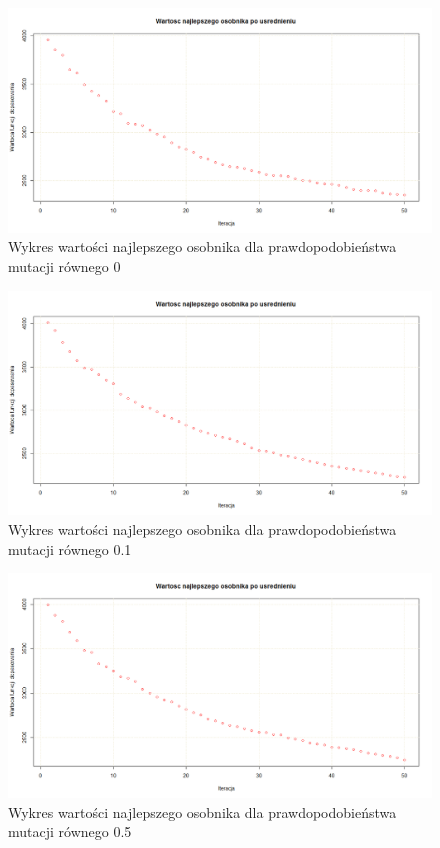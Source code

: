 \begin{figure}[H]
\centering

\includegraphics[scale=0.3]{IO_obrazy/bay29_mu_0}
\caption{Wykres wartości najlepszego osobnika dla prawdopodobieństwa mutacji równego 0}
\end{figure}

\begin{figure}[H]
\centering

\includegraphics[scale=0.3]{IO_obrazy/bay29_mu_01}
\caption{Wykres wartości najlepszego osobnika dla prawdopodobieństwa mutacji równego 0.1}
\end{figure}

\begin{figure}[H]
\centering

\includegraphics[scale=0.3]{IO_obrazy/bay29_mu_05}
\caption{Wykres wartości najlepszego osobnika dla prawdopodobieństwa mutacji równego 0.5}
\end{figure}


